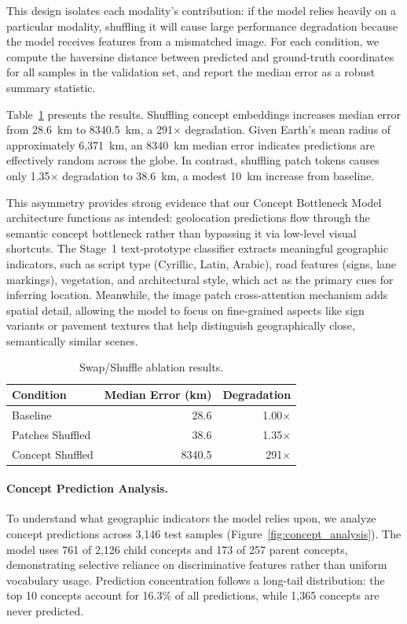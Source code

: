 \documentclass{uva-inf-article}
\begin{document}
This design isolates each modality's contribution: if the model relies heavily on a particular modality, shuffling it will cause large performance degradation because the model receives features from a mismatched image. For each condition, we compute the haversine distance between predicted and ground-truth coordinates for all samples in the validation set, and report the median error as a robust summary statistic.

Table~\ref{tab:swap_shuffle} presents the results. Shuffling concept embeddings increases median error from 28.6~km to 8340.5~km, a 291$\times$ degradation. Given Earth's mean radius of approximately 6,371~km, an 8340~km median error indicates predictions are effectively random across the globe. In contrast, shuffling patch tokens causes only 1.35$\times$ degradation to 38.6~km, a modest 10~km increase from baseline.

This asymmetry provides strong evidence that our Concept Bottleneck Model architecture functions as intended: geolocation predictions flow through the semantic concept bottleneck rather than bypassing it via low-level visual shortcuts. The Stage~1 text-prototype classifier extracts meaningful geographic indicators, such as script type (Cyrillic, Latin, Arabic), road features (signs, lane markings), vegetation, and architectural style, which act as the primary cues for inferring location. Meanwhile, the image patch cross-attention mechanism adds spatial detail, allowing the model to focus on fine-grained aspects like sign variants or pavement textures that help distinguish geographically close, semantically similar scenes.

\begin{table}[h!]
    \centering
    \begin{tabular}{lrr}
        \toprule
        \textbf{Condition} & \textbf{Median Error (km)} & \textbf{Degradation} \\
        \midrule
        Baseline & 28.6 & 1.00$\times$ \\
        Patches Shuffled & 38.6 & 1.35$\times$ \\
        Concept Shuffled & 8340.5 & 291$\times$ \\
        \bottomrule
    \end{tabular}
    \caption{Swap/Shuffle ablation results.}
    \label{tab:swap_shuffle}
\end{table}

\paragraph{Concept Prediction Analysis.}
To understand what geographic indicators the model relies upon, we analyze concept predictions across 3,146 test samples (Figure~\ref{fig:concept_analysis}). The model uses 761 of 2,126 child concepts and 173 of 257 parent concepts, demonstrating selective reliance on discriminative features rather than uniform vocabulary usage. Prediction concentration follows a long-tail distribution: the top 10 concepts account for 16.3\% of all predictions, while 1,365 concepts are never predicted.
\end{document}
